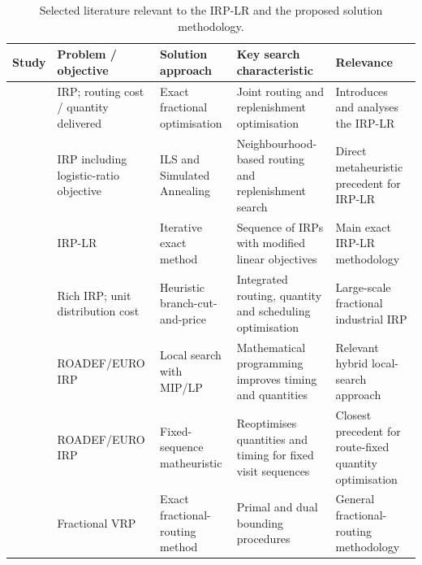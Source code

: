 \documentclass{article}
\begin{document}
\begin{table}[!htbp]
\centering
\caption{Selected literature relevant to the IRP-LR and the proposed
solution methodology.}
\label{tab:literature_irplr_background}
\scriptsize
\renewcommand{\arraystretch}{1.18}
\setlength{\tabcolsep}{3pt}

\begin{tabularx}{\textwidth}{
>{\raggedright\arraybackslash}p{2.15cm}
>{\raggedright\arraybackslash}p{2.55cm}
>{\raggedright\arraybackslash}p{2.75cm}
>{\raggedright\arraybackslash}X
>{\raggedright\arraybackslash}X}
\toprule
\textbf{Study}
&
\textbf{Problem / objective}
&
\textbf{Solution approach}
&
\textbf{Key search characteristic}
&
\textbf{Relevance}
\\
\midrule

\cite{archetti2017logistic}
&
IRP; routing cost / quantity delivered
&
Exact fractional optimisation
&
Joint routing and replenishment optimisation
&
Introduces and analyses the IRP-LR
\\

\cite{alvarez2018iterated}
&
IRP including logistic-ratio objective
&
ILS and Simulated Annealing
&
Neighbourhood-based routing and replenishment search
&
Direct metaheuristic precedent for IRP-LR
\\

\cite{archetti2019exact}
&
IRP-LR
&
Iterative exact method
&
Sequence of IRPs with modified linear objectives
&
Main exact IRP-LR methodology
\\

\cite{absi2020branch}
&
Rich IRP; unit distribution cost
&
Heuristic branch-cut-and-price
&
Integrated routing, quantity and scheduling optimisation
&
Large-scale fractional industrial IRP
\\

\cite{su2020matheuristic}
&
ROADEF/EURO IRP
&
Local search with MIP/LP
&
Mathematical programming improves timing and quantities
&
Relevant hybrid local-search approach
\\

\cite{he2020fixedsequence}
&
ROADEF/EURO IRP
&
Fixed-sequence matheuristic
&
Reoptimises quantities and timing for fixed visit sequences
&
Closest precedent for route-fixed quantity optimisation
\\

\cite{baldacci2020fractional}
&
Fractional VRP
&
Exact fractional-routing method
&
Primal and dual bounding procedures
&
General fractional-routing methodology
\\


\end{tabularx}
\end{table}
\end{document}
